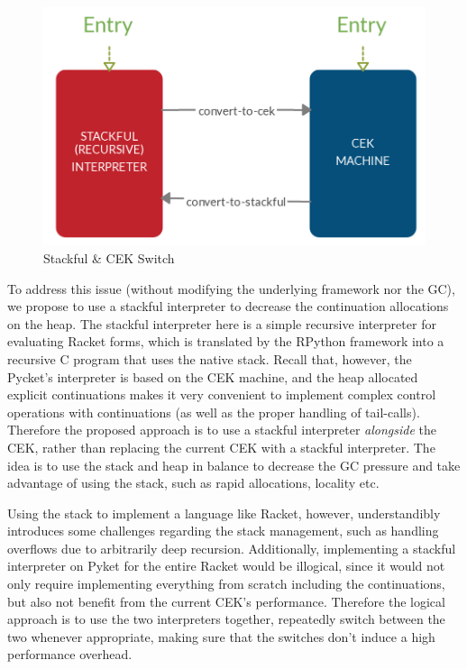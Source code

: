 \begin{figure}
  \vspace{-0.4cm}
  \begin{mdframed}
      \centering
  \includegraphics[scale=0.15]{img/cek-stackful-switch}
  \caption[hede]{Stackful \& CEK Switch}
  \label{fig:cek--switch-stack}
  \end{mdframed}
\end{figure}


To address this issue (without modifying the underlying framework nor
the GC), we propose to use a stackful interpreter to decrease the
continuation allocations on the heap. The stackful interpreter here is
a simple recursive interpreter for evaluating Racket forms, which is
translated by the RPython framework into a recursive C program that
uses the native stack. Recall that, however, the Pycket's interpreter
is based on the CEK machine, and the heap allocated explicit
continuations makes it very convenient to implement complex control
operations with continuations (as well as the proper handling of
tail-calls). Therefore the proposed approach is to use a stackful
interpreter \emph{alongside} the CEK, rather than replacing the
current CEK with a stackful interpreter. The idea is to use the stack
and heap in balance to decrease the GC pressure and take advantage of
using the stack, such as rapid allocations, locality etc.

Using the stack to implement a language like Racket, however,
understandibly introduces some challenges regarding the stack
management, such as handling overflows due to arbitrarily deep
recursion. Additionally, implementing a stackful interpreter on Pyket
for the entire Racket would be illogical, since it would not only
require implementing everything from scratch including the
continuations, but also not benefit from the current CEK's
performance. Therefore the logical approach is to use the two
interpreters together, repeatedly switch between the two whenever
appropriate, making sure that the switches don't induce a high
performance overhead.

